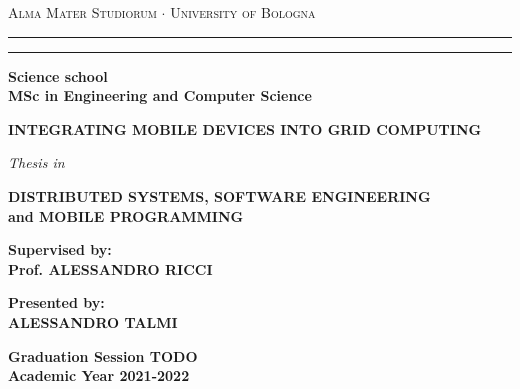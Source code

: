 \begin{titlepage}
    \begin{center}
    {{\Large{
        \textsc{Alma Mater Studiorum $\cdot$ University of Bologna}
    }}}
    \rule[0.1cm]{15.8cm}{0.1mm}
    \rule[0.5cm]{15.8cm}{0.6mm}
    {\small{\bf Science school\\ 
    MSc in Engineering and Computer Science }}
    \vspace{39mm}
    \end{center}
    \begin{center}
        \huge\bf INTEGRATING MOBILE DEVICES INTO GRID COMPUTING
    \end{center}
    \vspace{39mm}
    \begin{center}
    {{\emph{Thesis in}}}
    
    \vspace{1mm}
    {{\bf{DISTRIBUTED SYSTEMS, SOFTWARE ENGINEERING\\and MOBILE PROGRAMMING}}}
    \vspace{18mm}
    \end{center}
    \par
    \noindent
    \begin{minipage}[t]{0.47\textwidth}
    {\large{\bf Supervised by:\\
    Prof. ALESSANDRO RICCI}}
    \end{minipage}
    \hfill
    \begin{minipage}[t]{0.47\textwidth}\raggedleft
    {\large{\bf Presented by:\\
    ALESSANDRO TALMI}}
    \end{minipage}
    \vspace{20mm}
    \begin{center}
    {\large{\bf Graduation Session TODO\\
    Academic Year 2021-2022}}
    \end{center}
\end{titlepage}
